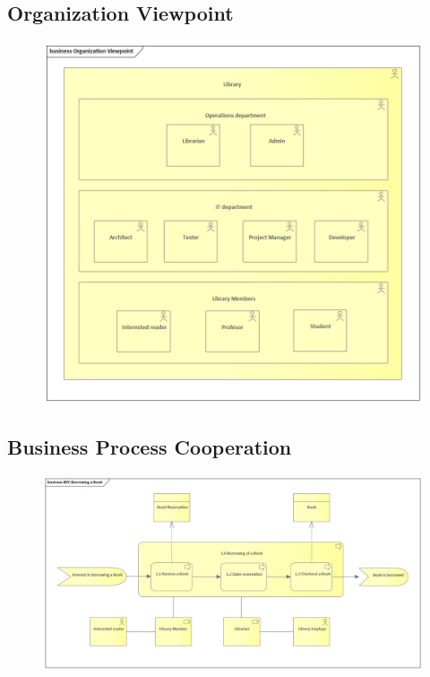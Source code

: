 \documentclass[11pt,twoside,a4paper]{article}
\begin{document}
\subsection{Organization Viewpoint}
\begin{figure}[!ht]
    \includegraphics[scale=.9]{../ea/Organization Viewpoint.png}
    \centering
\end{figure}

\pagebreak
\subsection{Business Process Cooperation}
\begin{figure}[!ht]
    \includegraphics[scale=.65]{../ea/BPC-Borrowing a Book.png}
    \centering
\end{figure}
\end{document}
